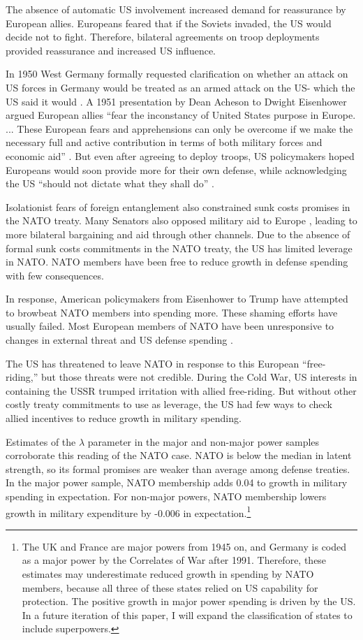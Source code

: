 \documentclass[12pt]{article}
\begin{document}
The absence of automatic US involvement increased demand for reassurance by European allies. 
Europeans feared that if the Soviets invaded, the US would decide not to fight. 
Therefore, bilateral agreements on troop deployments provided reassurance and increased US influence. 


In 1950 West Germany formally requested clarification on whether an attack on US forces in Germany would be treated as an armed attack on the US- which the US said it would \citep[pg. 395]{Acheson1969}. 
A 1951 presentation by Dean Acheson to Dwight Eisenhower argued European allies ``fear the inconstancy of United States purpose in Europe. ... These European fears and apprehensions can only be overcome if we make the necessary full and active contribution in terms of both military forces and economic aid'' \citep[pg. 3]{Acheson1951}.  
But even after agreeing to deploy troops, US policymakers hoped Europeans would soon provide more for their own defense, while acknowledging the US ``should not dictate what they shall do'' \citep[pg. 2]{Johnson1950}. 


Isolationist fears of foreign entanglement also constrained sunk costs promises in the NATO treaty. 
Many Senators also opposed military aid to Europe \citep[pg 285]{Acheson1969}, leading to more bilateral bargaining and aid through other channels. 
Due to the absence of formal sunk costs commitments in the NATO treaty, the US has limited leverage in NATO. 
NATO members have been free to reduce growth in defense spending with few consequences. 


In response, American policymakers from Eisenhower to Trump have attempted to browbeat NATO members into spending more. 
These shaming efforts have usually failed. 
Most European members of NATO have been unresponsive to changes in external threat and US defense spending \citep{PluemperNeumayer2015}. 


The US has threatened to leave NATO in response to this European ``free-riding,'' but those threats were not credible. 
During the Cold War, US interests in containing the USSR trumped irritation with allied free-riding.  
But without other costly treaty commitments to use as leverage, the US had few ways to check allied incentives to reduce growth in military spending. 


Estimates of the $\lambda$ parameter in the major and non-major power samples corroborate this reading of the NATO case. 
NATO is below the median in latent strength, so its formal promises are weaker than average among defense treaties. 
In the major power sample, NATO membership adds 0.04 to growth in military spending in expectation.
For non-major powers, NATO membership lowers growth in military expenditure by -0.006 in expectation.\footnote{
The UK and France are major powers from 1945 on, and Germany is coded as a major power by the Correlates of War after 1991. Therefore, these estimates may underestimate reduced growth in spending by NATO members, because all three of these states relied on US capability for protection. The positive growth in major power spending is driven by the US. In a future iteration of this paper, I will expand the classification of states to include superpowers.}
\end{document}
